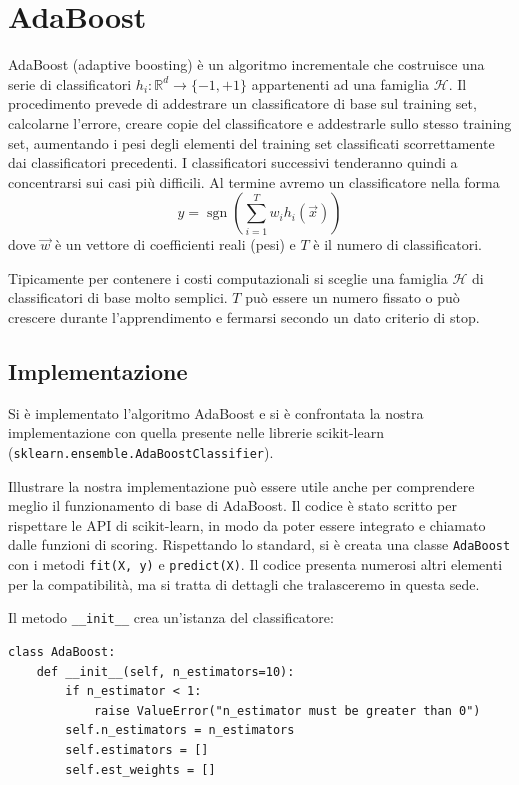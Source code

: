\documentclass[12pt,a4paper,oneside,hidelinks]{report}
\DeclareMathOperator*{\sgn}{sgn}
\begin{document}
\section{AdaBoost}
AdaBoost (adaptive boosting) è un algoritmo incrementale che costruisce una serie di classificatori $ h_{i}:\mathbb{R}^{d}\rightarrow \{-1,+1\} $ appartenenti ad una famiglia $ \mathcal{H} $. 
Il procedimento prevede di addestrare un classificatore di base sul training set, calcolarne l'errore, creare copie del classificatore e addestrarle sullo stesso training set, aumentando i pesi degli elementi del training set classificati scorrettamente dai classificatori precedenti. I classificatori successivi tenderanno quindi a concentrarsi sui casi più difficili.
Al termine avremo un classificatore nella forma
\[\hat{y}=\sgn(\sum_{i=1}^{T} w_{i}h_{i}(\vec{x}))\]
dove $ \vec{w} $ è un vettore di coefficienti reali (pesi) e $ T $ è il numero di classificatori.

Tipicamente per contenere i costi computazionali si sceglie una famiglia $ \mathcal{H} $ di classificatori di base molto semplici. $ T $ può essere un numero fissato o può crescere durante l'apprendimento e fermarsi secondo un dato criterio di stop.

\subsection{Implementazione}

Si è implementato l'algoritmo AdaBoost e si è confrontata la nostra implementazione con quella presente nelle librerie scikit-learn (\texttt{sklearn.ensemble.AdaBoostClassifier}).

Illustrare la nostra implementazione può essere utile anche per comprendere meglio il funzionamento di base di AdaBoost. 
Il codice è stato scritto per rispettare le API di scikit-learn, in modo da poter essere integrato e chiamato dalle funzioni di scoring. Rispettando lo standard, si è creata una classe \texttt{AdaBoost} con i metodi \texttt{fit(X, y)} e \texttt{predict(X)}. Il codice presenta numerosi altri elementi per la compatibilità, ma si tratta di dettagli che tralasceremo in questa sede. 

Il metodo \texttt{\_\_init\_\_} crea un'istanza del classificatore:
\begin{lstlisting}
class AdaBoost:
    def __init__(self, n_estimators=10):
        if n_estimator < 1:
            raise ValueError("n_estimator must be greater than 0")
        self.n_estimators = n_estimators
        self.estimators = []
        self.est_weights = []
\end{lstlisting}
\end{document}

